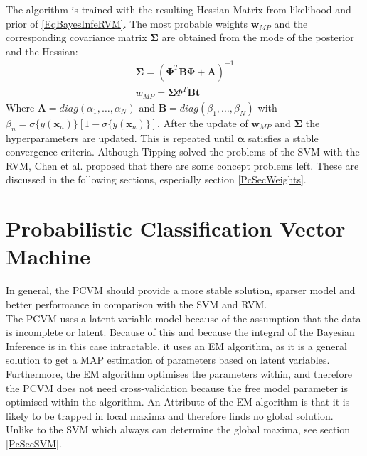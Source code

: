 The algorithm is trained with the resulting Hessian Matrix from likelihood and prior of \ref{EqBayesInfeRVM}.
The most probable weights $\mathbf{w}_{MP}$ and the corresponding covariance matrix $\boldsymbol{\Sigma}$ are obtained from the mode of the posterior and the Hessian:
\begin{equation}
	\begin{split}
		\boldsymbol{\Sigma} = (\boldsymbol{\Phi}^T\mathbf{B}\boldsymbol{\Phi} + \mathbf{A})^{-1}\\
		w_{MP}=\boldsymbol{\Sigma}\Phi^T\mathbf{B}\mathbf{t} 
	\end{split}
\end{equation}
Where $\mathbf{A} = diag(\alpha_1,\dots,\alpha_N)$ and $\mathbf{B} = diag(\beta_1,\dots,\beta_N)$ with $\beta_n =\sigma\{y(\mathbf{x}_n)\}[1-\sigma\{y(\mathbf{x}_n)\}]$.
After the update of $\mathbf{w}_{MP}$ and $\boldsymbol{\Sigma}$ the hyperparameters are updated.
This is repeated until $\boldsymbol{\alpha}$ satisfies a stable convergence criteria.\cite[p. 219]{Tipping.2001}\newline
Although Tipping solved the problems of the \ac{SVM} with the \ac{RVM}, Chen et al. proposed that there are some concept problems left.\cite{Chen.2009}
These are discussed in the following sections, especially section \ref{PcSecWeights}.
\section{Probabilistic Classification Vector Machine}\label{PcSecAdvan}
In general, the \acf{PCVM} should provide a more stable solution, sparser model and better performance in comparison with the \acs{SVM} and \acs{RVM}.\cite{Chen.2009}\\
The \ac{PCVM} uses a latent variable model because of the assumption that the data is incomplete or latent.
Because of this and because the integral of the Bayesian Inference is in this case intractable, it uses an \ac{EM} algorithm, as it is a general solution to get a \ac{MAP} estimation of parameters based on latent variables.
Furthermore, the \acs{EM} algorithm optimises the parameters within, and therefore the \ac{PCVM} does not need cross-validation because the free model parameter is optimised within the algorithm.\cite{Chen.2009}\newline
An Attribute of the \acs{EM} algorithm is that it is likely to be trapped in local maxima and therefore finds no global solution.\cite{YiWang.2006}
Unlike to the \acs{SVM} which always can determine the global maxima, see section \ref{PcSecSVM}.\newline

